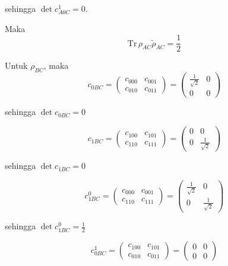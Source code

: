 sehingga $\det c_{A0C}^1 = 0$.

Maka
\begin{equation}
	\mathrm{Tr}\,\rho_{AC}\tilde{\rho}_{AC}=\frac{1}{2}
\end{equation}

Untuk $\rho_{BC}$, maka
\begin{equation}
	c_{0BC}=
	\begin{pmatrix}
		c_{000} & c_{001} \\
		c_{010} & c_{011}
	\end{pmatrix}=
	\begin{pmatrix}
		\frac{1}{\sqrt{2}} & 0 \\
		0 & 0
	\end{pmatrix}
\end{equation}

sehingga $\det c_{0BC} = 0$

\begin{equation}
	c_{1BC}=
	\begin{pmatrix}
		c_{100} & c_{101} \\
		c_{110} & c_{111}
	\end{pmatrix}=
	\begin{pmatrix}
		0 & 0 \\
		0 & \frac{1}{\sqrt{2}}
	\end{pmatrix}
\end{equation}

sehingga $\det c_{1BC} = 0$

\begin{equation}
	c_{1BC}^0=
	\begin{pmatrix}
		c_{000} & c_{001} \\
		c_{110} & c_{111}
	\end{pmatrix}=
	\begin{pmatrix}
		\frac{1}{\sqrt{2}} & 0 \\
		0 & \frac{1}{\sqrt{2}}
	\end{pmatrix}
\end{equation}

sehingga $\det c_{1BC}^0 = \frac{1}{2}$

\begin{equation}
	c_{0BC}^1=
	\begin{pmatrix}
		c_{100} & c_{101} \\
		c_{010} & c_{011}
	\end{pmatrix}=
	\begin{pmatrix}
		0 & 0 \\
		0 & 0
	\end{pmatrix}
\end{equation}

